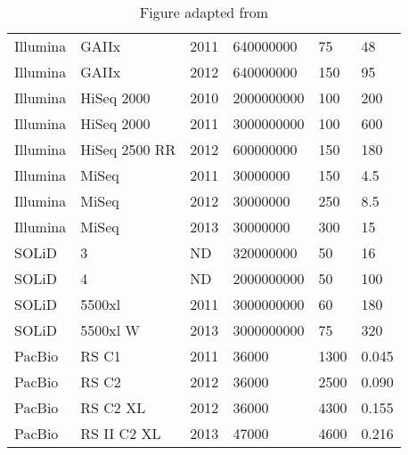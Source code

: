 \begin{sidewaystable}
\begin{tabular}{llllll}
Illumina   & GAIIx           & 2011 & 640000000     & 75                            & 48                        \\
Illumina   & GAIIx           & 2012 & 640000000     & 150                           & 95                        \\
Illumina   & HiSeq 2000      & 2010 & 2000000000    & 100                           & 200                       \\
Illumina   & HiSeq 2000      & 2011 & 3000000000    & 100                           & 600                       \\
Illumina   & HiSeq 2500 RR   & 2012 & 600000000     & 150                           & 180                       \\
Illumina   & MiSeq           & 2011 & 30000000      & 150                           & 4.5                       \\
Illumina   & MiSeq           & 2012 & 30000000      & 250                           & 8.5                       \\
Illumina   & MiSeq           & 2013 & 30000000      & 300                           & 15                        \\
SOLiD      & 3               & ND   & 320000000     & 50                            & 16                        \\
SOLiD      & 4               & ND   & 2000000000    & 50                            & 100                       \\
SOLiD      & 5500xl          & 2011 & 3000000000    & 60                            & 180                       \\
SOLiD      & 5500xl W        & 2013 & 3000000000    & 75                            & 320                       \\
PacBio     & RS C1           & 2011 & 36000         & 1300                          & 0.045                     \\
PacBio     & RS C2           & 2012 & 36000         & 2500                          & 0.090                     \\
PacBio     & RS C2 XL        & 2012 & 36000         & 4300                          & 0.155                     \\
PacBio     & RS II C2 XL     & 2013 & 47000         & 4600                          & 0.216                    \\
\bottomrule
\end{tabular}
\caption[Current HTS Sequencing Platforms]{Figure adapted from \citep{developmentinNGS:2012bs}}
\label{tab:figure2_1}
\end{sidewaystable}